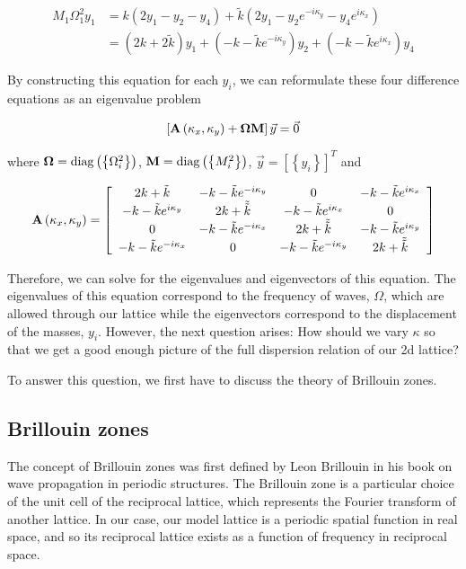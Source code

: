 \begin{align}
  M_1\Omega_1^{2}y_1
      &=k\left(2y_1-y_2-y_4\right)+
       \tilde{k}\left(2y_1-y_{2}e^{-i\kappa_y}-y_{4}e^{i\kappa_x}\right) \\
      &=\left(2k+2\tilde{k}\right)y_1+\left(-k-\tilde{k}e^{-i\kappa_y}\right)y_2+
       \left(-k-\tilde{k}e^{i\kappa_x}\right)y_4
\end{align}

By constructing this equation for each $y_i$, we can reformulate these four
difference equations as an eigenvalue problem

\begin{align}
  \left[\mathbf{A}\left(\kappa_{x},\kappa_{y}\right)+\mathbf{\Omega}\mathbf{M}\right]\vec{y}=\vec{0}
\label{eq:sqeig}
\end{align}

where $\mathbf{\Omega}=\operatorname{diag}\left(\left\{\Omega_i^2\right\}\right)$,
$\mathbf{M}=\operatorname{diag}\left(\left\{M_i^2\right\}\right)$,
$\vec{y}=\left[\left\{y_i\right\}\right]^T$ and

\begin{align}
  \mathbf{A}\left(\kappa_{x},\kappa_{y}\right)=\left[
\begin{array}{cccc}
2k+\tilde{k} & -k-\tilde{k}e^{-i\kappa_{y}} & 0 & -k-\tilde{k}e^{i\kappa_{x}}\\
-k-\tilde{k}e^{i\kappa_{y}} & 2k+\tilde{\tilde{k}} & -k-\tilde{k}e^{i\kappa_{x}} & 0\\
0 & -k-\tilde{k}e^{-i\kappa_{x}} & 2k+\tilde{\tilde{k}} & -k-\tilde{k}e^{i\kappa_{y}}\\
-k-\tilde{k}e^{-i\kappa_{x}} & 0 & -k-\tilde{k}e^{-i\kappa_{y}} & 2k+\tilde{\tilde{k}}
\end{array}\right]
\end{align}

Therefore, we can solve for the eigenvalues and eigenvectors of this equation.
The eigenvalues of this equation correspond to the frequency of waves,
$\Omega$, which are allowed through our lattice while the eigenvectors
correspond to the displacement of the masses, $y_i$. However, the next question
arises: How should we vary $\kappa$ so that we get a good enough picture of the
full dispersion relation of our 2d lattice?

To answer this question, we first have to discuss the theory of Brillouin zones.

\subsection{Brillouin zones}
\label{brizones}
The concept of Brillouin zones was first defined by Leon Brillouin in his book
on wave propagation in periodic structures.\cite{brillouin} The Brillouin zone
is a particular choice of the unit cell of the reciprocal lattice, which
represents the Fourier transform of another lattice. In our case, our model
lattice is a periodic spatial function in real space, and so its reciprocal
lattice exists as a function of frequency in reciprocal space.

